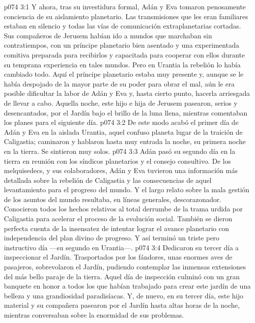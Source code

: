 \vs p074 3:1 Y ahora, tras su investidura formal, Adán y Eva tomaron penosamente conciencia de su aislamiento planetario. Las transmisiones que les eran familiares estaban en silencio y todas las vías de comunicación extraplanetarias cortadas. Sus compañeros de Jerusem habían ido a mundos que marchaban sin contratiempos, con un príncipe planetario bien asentado y una experimentada comitiva preparada para recibirlos y capacitada para cooperar con ellos durante su temprana experiencia en tales mundos. Pero en Urantia la rebelión lo había cambiado todo. Aquí el príncipe planetario estaba muy presente y, aunque se le había despojado de la mayor parte de su poder para obrar el mal, aún le era posible dificultar la labor de Adán y Eva y, hasta cierto punto, hacerla arriesgada de llevar a cabo. Aquella noche, este hijo e hija de Jerusem pasearon, serios y desencantados, por el Jardín bajo el brillo de la luna llena, mientras comentaban los planes para el siguiente día.
\vs p074 3:2 De este modo acabó el primer día de Adán y Eva en la aislada Urantia, aquel confuso planeta lugar de la traición de Caligastia; caminaron y hablaron hasta muy entrada la noche, su primera noche en la tierra. Se sintieron muy solos.
\vs p074 3:3 \pc Adán pasó su segundo día en la tierra en reunión con los síndicos planetarios y el consejo consultivo. De los melquisedecs, y sus colaboradores, Adán y Eva tuvieron una información más detallada sobre la rebelión de Caligastia y las consecuencias de aquel levantamiento para el progreso del mundo. Y el largo relato sobre la mala gestión de los asuntos del mundo resultaba, en líneas generales, descorazonador. Conocieron todos los hechos relativos al total derrumbe de la trama urdida por Caligastia para acelerar el proceso de la evolución social. También se dieron perfecta cuenta de la insensatez de intentar lograr el avance planetario con independencia del plan divino de progreso. Y así terminó un triste pero instructivo día ---su segundo en Urantia---.
\vs p074 3:4 \pc Dedicaron su tercer día a inspeccionar el Jardín. Trasportados por los fándores, unas enormes aves de pasajeros, sobrevolaron el Jardín, pudiendo contemplar las inmensas extensiones del más bello paraje de la tierra. Aquel día de inspección culminó con un gran banquete en honor a todos los que habían trabajado para crear este jardín de una belleza y una grandiosidad paradisíacas. Y, de nuevo, en su tercer día, este hijo material y su compañera pasearon por el Jardín hasta altas horas de la noche, mientras conversaban sobre la enormidad de sus problemas.
